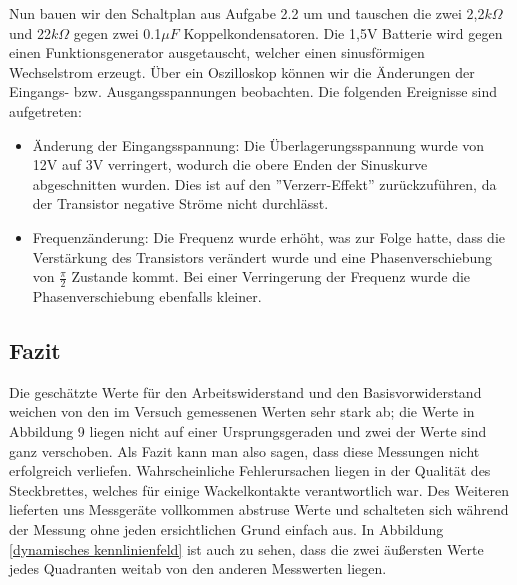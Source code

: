Nun bauen wir den Schaltplan aus Aufgabe 2.2 um und tauschen die zwei 2,2\(k\Omega\) und 22\(k\Omega\) gegen zwei 0.1\(\mu F\) Koppelkondensatoren. Die 1,5V Batterie wird gegen einen Funktionsgenerator ausgetauscht, welcher einen sinusförmigen Wechselstrom erzeugt. Über ein Oszilloskop können wir die Änderungen der Eingangs- bzw. Ausgangsspannungen beobachten. Die folgenden Ereignisse sind aufgetreten:

\begin{itemize}
\item Änderung der Eingangsspannung: Die Überlagerungsspannung wurde von 12V auf 3V verringert, wodurch die obere Enden der Sinuskurve abgeschnitten wurden. Dies ist auf den ''Verzerr-Effekt'' zurückzuführen, da der Transistor negative Ströme nicht durchlässt.
\item Frequenzänderung: Die Frequenz wurde erhöht, was zur Folge hatte, dass die Verstärkung des Transistors verändert wurde und eine Phasenverschiebung von \(\frac{\pi}{2}\) Zustande kommt. Bei einer Verringerung der Frequenz wurde die Phasenverschiebung ebenfalls kleiner.
\end{itemize}

\subsection{Fazit}

Die geschätzte Werte für den Arbeitswiderstand und den Basisvorwiderstand weichen von den im Versuch gemessenen Werten sehr stark ab; die Werte in Abbildung 9 liegen nicht auf einer Ursprungsgeraden und zwei der Werte sind ganz verschoben. Als Fazit kann man also sagen, dass diese Messungen nicht erfolgreich verliefen. Wahrscheinliche Fehlerursachen liegen in der Qualität des Steckbrettes, welches für einige Wackelkontakte verantwortlich war. Des Weiteren lieferten uns Messgeräte vollkommen abstruse Werte und schalteten sich während der Messung ohne jeden ersichtlichen Grund einfach aus. In Abbildung \ref{dynamisches kennlinienfeld} ist auch zu sehen, dass die zwei äußersten Werte jedes Quadranten weitab von den anderen Messwerten liegen.\\

